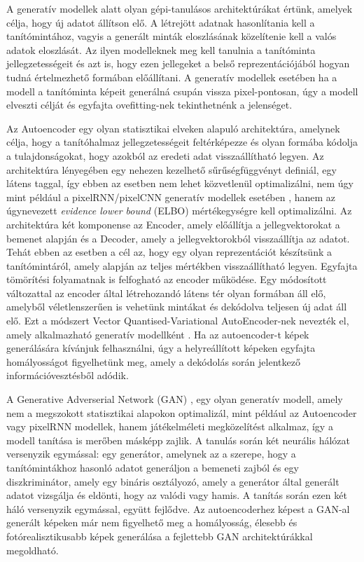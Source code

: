 A generatív modellek alatt olyan gépi-tanulásos architektúrákat értünk, amelyek célja, hogy új adatot állítson elő. A létrejött adatnak hasonlítania kell a tanítómintához, vagyis a generált minták eloszlásának közelítenie kell a valós adatok eloszlását. Az ilyen modelleknek meg kell tanulnia a tanítóminta jellegzetességeit és azt is, hogy ezen jellegeket a belső reprezentációjából hogyan tudná értelmezhető formában előállítani. A generatív modellek esetében ha a modell a tanítóminta képeit generálná csupán vissza pixel-pontosan, úgy a modell elveszti célját és egyfajta ovefitting-nek tekinthetnénk a jelenséget.

Az Autoencoder egy olyan statisztikai elveken alapuló architektúra, amelynek célja, hogy a tanítóhalmaz jellegzetességeit feltérképezze és olyan formába kódolja a tulajdonságokat, hogy azokból az eredeti adat visszaállítható legyen. Az architektúra lényegében egy nehezen kezelhető sűrűségfüggvényt definiál, egy látens taggal, így ebben az esetben nem lehet közvetlenül optimalizálni, nem úgy mint például a pixelRNN/pixelCNN generatív modellek esetében \cite{oord2016conditional}, hanem az úgynevezett \textit{evidence lower bound} (ELBO) mértékegységre kell optimalizálni\cite{oord2017neural}. Az architektúra két komponense az Encoder, amely előállítja a jellegvektorokat a bemenet alapján és a Decoder, amely a jellegvektorokból visszaállítja az adatot. Tehát ebben az esetben a cél az, hogy egy olyan reprezentációt készítsünk a tanítómintáról, amely alapján az teljes mértékben visszaállítható legyen. Egyfajta tömörítési folyamatnak is felfogható az encoder működése. Egy módosított változattal az encoder által létrehozandó látens tér olyan formában áll elő, amelyből véletlenszerűen is vehetünk mintákat és dekódolva teljesen új adat áll elő. Ezt a módszert Vector Quantised-Variational AutoEncoder-nek nevezték el, amely alkalmazható generatív modellként \cite{oord2017neural}.
Ha az autoencoder-t képek generálására kívánjuk felhasználni, úgy a helyreállított képeken egyfajta homályosságot figyelhetünk meg, amely a dekódolás során jelentkező információvesztésből adódik.

A Generative Adverserial Network (GAN) \cite{goodfellow2014generative}, egy olyan generatív modell, amely nem a megszokott statisztikai alapokon optimalizál, mint például az Autoencoder vagy pixelRNN modellek, hanem játékelméleti megközelítést alkalmaz, így a modell tanítása is merőben másképp zajlik.
A tanulás során két neurális hálózat versenyzik egymással: egy generátor, amelynek az a szerepe, hogy a tanítómintákhoz hasonló adatot generáljon a bemeneti zajból és egy diszkriminátor, amely egy bináris osztályozó, amely a generátor által generált adatot vizsgálja és eldönti, hogy az valódi vagy hamis.
A tanítás során ezen két háló versenyzik egymással, együtt fejlődve. Az autoencoderhez képest a GAN-al generált képeken már nem figyelhető meg a homályosság, élesebb és fotórealisztikusabb képek generálása a fejlettebb GAN architektúrákkal megoldható.

